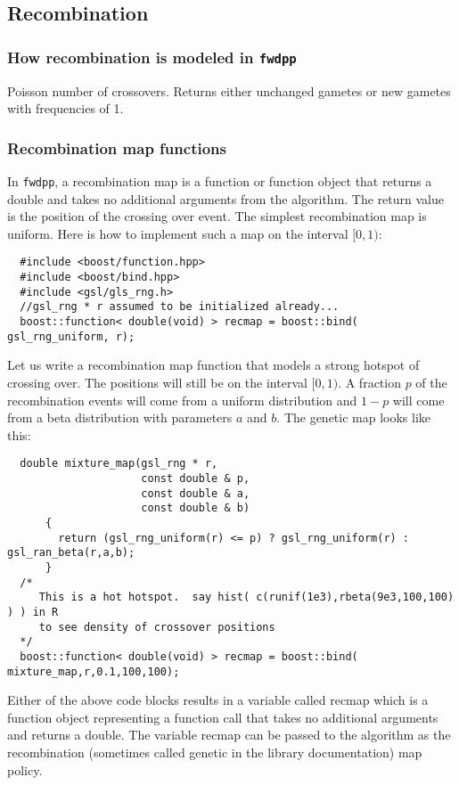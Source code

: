 \documentclass{article}
\begin{document}
\subsection{Recombination}
\subsubsection{\label{recmodel}How recombination is modeled in \texttt{fwdpp}}
Poisson number of crossovers.  Returns either unchanged gametes or new gametes with frequencies of 1.

\subsubsection{Recombination map functions}
In \texttt{fwdpp}, a recombination map is a function or function object that returns a double and takes no additional arguments from the algorithm.  The return value is the position of the crossing over event.  The simplest recombination map is uniform.  Here is how to implement such a map on the interval $[0,1)$:

\begin{lstlisting}
  #include <boost/function.hpp>
  #include <boost/bind.hpp>
  #include <gsl/gls_rng.h>
  //gsl_rng * r assumed to be initialized already...
  boost::function< double(void) > recmap = boost::bind( gsl_rng_uniform, r);
\end{lstlisting}

Let us write a recombination map function that models a strong hotspot of crossing over.  The positions will still be on the interval $[0,1)$.  A fraction $p$ of the recombination events will come from a uniform distribution and $1-p$ will come from a beta distribution with parameters $a$ and $b$.  The genetic map looks like this:
\begin{lstlisting}
  double mixture_map(gsl_rng * r, 
                     const double & p,
                     const double & a,
                     const double & b)
      {
        return (gsl_rng_uniform(r) <= p) ? gsl_rng_uniform(r) : gsl_ran_beta(r,a,b);
      }
  /*
     This is a hot hotspot.  say hist( c(runif(1e3),rbeta(9e3,100,100) ) ) in R 
     to see density of crossover positions
  */
  boost::function< double(void) > recmap = boost::bind( mixture_map,r,0.1,100,100);
\end{lstlisting}

Either of the above code blocks results in a variable called recmap which is a function object representing a function call that takes no additional arguments and returns a double.  The variable recmap can be passed to the algorithm as the recombination (sometimes called genetic in the library documentation) map policy.
\end{document}
